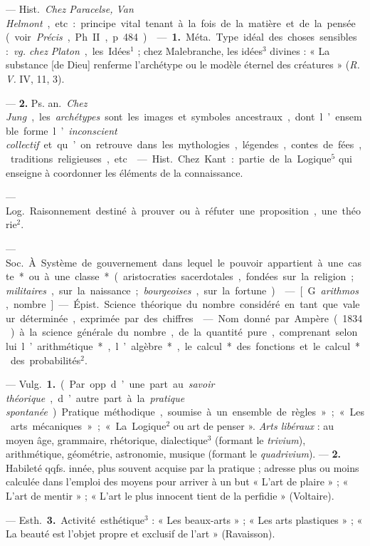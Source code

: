 \begin{itemize}[leftmargin=1cm, label=, itemsep=1pt]
{{{{ — \si{Hist.} {\it Chez Paracelse, Van
Helmont}, etc. : principe vital tenant
à la fois de la matière et de la pensée
(voir {\it Précis}, Ph. II, p. 484).

 — {\bf 1.} \si{Méta.} Type idéal des
choses sensibles : {\it vg. chez Platon},
les Idées$^1$ ; chez Malebranche, les
idées$^3$ divines : « La substance [de
Dieu] renferme l’archétype ou le
modèle éternel des créatures » ({\it R. V.}
IV, 11, 3).

— {\bf 2.} \si{Ps. an.} {\it Chez Jung}, les {\it archétypes} sont les images et symboles
ancestraux, dont l’ensemble forme
l’{\it inconscient collectif} et qu’on retrouve dans les mythologies,
légendes, contes de fées, traditions religieuses, etc.

 — \si{Hist.} Chez Kant :
partie de la Logique$^5$ qui enseigne à
coordonner les éléments de la connaissance.

 — \si{Log.} Raisonnement destiné à prouver ou à réfuter une
proposition, une théorie$^2$.

 — \si{Soc.} À Système de
gouvernement dans lequel le pouvoir appartient à une caste* ou à une
classe* (aristocraties sacerdotales,
fondées sur la religion; {\it militaires},
sur la naissance ; {\it bourgeoises}, sur la
fortune).

 — [G. {\it arithmos}, nombre]
— \si{Épist.} Science théorique du
nombre considéré en tant que valeur
déterminée, exprimée par des chiffres.

 — Nom donné par Ampère (1834) à la science générale du
nombre, de la quantité pure, comprenant selon lui l’arithmétique*,
l’algèbre*, le calcul* des fonctions
et le calcul* des probabilités$^2$.

 — \si{Vulg.} {\bf 1.} (Par opp. d’une part
au {\it savoir théorique}, d’autre part à la
{\it pratique spontanée}). Pratique méthodique, soumise à un ensemble de
règles » ; « Les arts mécaniques » ;
« La Logique$^2$ ou art de penser ».
{\it Arts libéraux} : au moyen âge, grammaire,
rhétorique, dialectique$^3$ (formant le {\it trivium}), arithmétique, géométrie,
astronomie, musique (formant le {\it quadrivium}). — {\bf 2.} Habileté
qqfs. innée, plus souvent acquise
par la pratique ; adresse plus ou
moins calculée dans l'emploi des
moyens pour arriver à un but
« L'art de plaire » ; « L'art de mentir » ;
« L'art le plus innocent tient de la
perfidie » (Voltaire).

— \si{Esth.} {\bf 3.} Activité esthétique$^3$ :
« Les beaux-arts » ; « Les arts plastiques » ; « La beauté est l’objet
propre et exclusif de l’art » (Ravaisson).

}}}}
\end{itemize}

